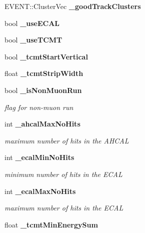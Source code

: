 \begin{DoxyCompactItemize}
\item 
EVENT::ClusterVec {\bfseries \_\-goodTrackClusters}\label{classCALICE_1_1AngleTrackFinder_a7218355d693e3d50095b7a5370bec077}

\item 
bool {\bfseries \_\-useECAL}\label{classCALICE_1_1AngleTrackFinder_a1590732ddda798d70bb97bd886a0bc22}

\item 
bool {\bfseries \_\-useTCMT}\label{classCALICE_1_1AngleTrackFinder_aad59f9038d2f9935f0dd0bd5b9700ed3}

\item 
bool {\bfseries \_\-tcmtStartVertical}\label{classCALICE_1_1AngleTrackFinder_a7f12d1a7817b3ee3686eefcf70fa0049}

\item 
float {\bfseries \_\-tcmtStripWidth}\label{classCALICE_1_1AngleTrackFinder_a1f5753f67ba97ef9aeb4cb57f75ff309}

\item 
bool {\bf \_\-isNonMuonRun}\label{classCALICE_1_1AngleTrackFinder_a599998d50ef67e2bc2e9a07b0864dd3d}

\begin{DoxyCompactList}\small\item\em flag for non-\/muon run \item\end{DoxyCompactList}\item 
int {\bf \_\-ahcalMaxNoHits}\label{classCALICE_1_1AngleTrackFinder_a94a071cd5fbe48451c8aace1168f9697}

\begin{DoxyCompactList}\small\item\em maximum number of hits in the AHCAL \item\end{DoxyCompactList}\item 
int {\bf \_\-ecalMinNoHits}\label{classCALICE_1_1AngleTrackFinder_a5db8580f90e8193fad643ca4415260ab}

\begin{DoxyCompactList}\small\item\em minimum number of hits in the ECAL \item\end{DoxyCompactList}\item 
int {\bf \_\-ecalMaxNoHits}\label{classCALICE_1_1AngleTrackFinder_a305795d0103cb33c9cf579d83d050968}

\begin{DoxyCompactList}\small\item\em maximum number of hits in the ECAL \item\end{DoxyCompactList}\item 
float {\bf \_\-tcmtMinEnergySum}\label{classCALICE_1_1AngleTrackFinder_ab5ac7f274d7c9936f4d19ed1ac463715}


\end{DoxyCompactItemize}
